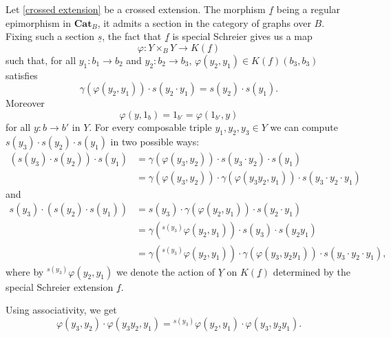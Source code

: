 \documentclass[11pt]{amsart}
\theoremstyle{plain}
\theoremstyle{definition}
\theoremstyle{remark}
\newcommand{\un}{\underline}
\begin{document}
Let \eqref{crossed extension} be a crossed extension. The morphism $\un{f}$ being a regular epimorphism in $\mathbf{Cat}_B$, it admits a section in the category of graphs over $B$. Fixing such a section $\un{s}$, the fact that $\un{f}$ is special Schreier gives us a map
\[ \varphi \colon Y \times_B Y \to K(\un{f}) \]
such that, for all $y_1\colon b_1\to b_2$ and $y_2\colon b_2\to b_3$, $\varphi(y_2,y_1)\in K(f)(b_3,b_3)$ satisfies
\begin{equation} \label{eq:def_varphi}
	\gamma(\varphi(y_2,y_1)) \cdot s(y_2\cdot y_1) = s(y_2)\cdot s(y_1).
\end{equation}
Moreover
\[\varphi(y,1_b) = 1_{b'} = \varphi(1_{b'},y)\]
for all $y\colon b\to b'$ in $Y$. For every composable triple $y_1, y_2, y_3 \in Y$ we can compute $s(y_3) \cdot s(y_2) \cdot s(y_1)$ in two possible ways:
\begin{align*}
	(s(y_3)\cdot s(y_2)) \cdot s(y_1) & = \gamma(\varphi(y_3,y_2))\cdot s(y_3\cdot y_2) \cdot s(y_1)\\
	& = \gamma(\varphi(y_3,y_2))\cdot  \gamma(\varphi(y_3 y_2,y_1)) \cdot s(y_3\cdot y_2 \cdot y_1)
\end{align*}
and
\begin{align*}
	s(y_3)\cdot (s(y_2)\cdot s(y_1)) & = s(y_3)\cdot \gamma(\varphi(y_2,y_1))\cdot s(y_2\cdot y_1)\\
	& = \gamma({}^{s(y_3)}\varphi(y_2,y_1))\cdot s(y_3) \cdot s(y_2y_1) \\
	& = \gamma({}^{s(y_3)}\varphi(y_2,y_1)) \cdot \gamma(\varphi(y_3,y_2y_1)) \cdot s(y_3\cdot y_2 \cdot y_1),
\end{align*}
where by ${}^{s(y_3)}\varphi(y_2,y_1)$ we denote the action of $\un{Y}$ on $K(\un{f})$ determined by the special Schreier extension $\un{f}$.

Using associativity, we get
\begin{equation} \label{eq:id_varphi}
	\varphi (y_3,y_2)\cdot \varphi (y_3y_2,y_1) = {}^{s(y_3)}\varphi(y_2,y_1) \cdot\varphi (y_3,y_2y_1).
\end{equation}
\end{document}
